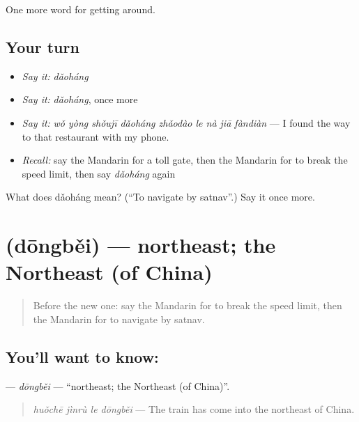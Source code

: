 \begin{grammarlens}[title={What you've built}]
One more word for getting around.
\end{grammarlens}

\subsection*{Your turn}
\begin{itemize}
\raggedright
  \item \emph{Say it:} \emph{dǎoháng}
  \item \emph{Say it:} \emph{dǎoháng}, once more
  \item \emph{Say it:} \emph{wǒ yòng shǒujī dǎoháng zhǎodào le nà jiā fàndiàn} — I found the way to that restaurant with my phone.
  \item \emph{Recall:} say the Mandarin for a toll gate, then the Mandarin for to break the speed limit, then say \emph{dǎoháng} again
\end{itemize}

\begin{tcolorbox}[breakable,colback=teal!4,colframe=teal!35!black,title={Before you move on}]
What does dǎoháng mean? (\textquotedblleft{}To navigate by satnav\textquotedblright{}.) Say it once more.
\end{tcolorbox}
\section[\texorpdfstring{\zh{东北} (dōngběi)}{东北 (dōngběi)}]{ (dōngběi) — northeast; the Northeast (of China)}

\label{lesson:ZH-C422-dongbei}



\begin{quote}
Before the new one: say the Mandarin for to break the speed limit, then the Mandarin for to navigate by satnav.
\end{quote}

\subsection*{You'll want to know: }
\textbf{} — \emph{dōngběi} — \textquotedblleft{}northeast; the Northeast (of China)\textquotedblright{}.

\begin{quote}
\textbf{} \emph{huǒchē jìnrù le dōngběi} — The train has come into the northeast of China.
\end{quote}

